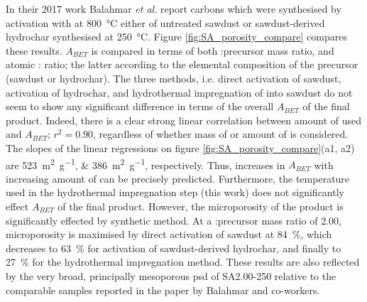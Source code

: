 In their 2017 work Balahmar \textit{et al.} report carbons which were synthesised by activation with  at \qty{800}{\degreeCelsius} either of untreated sawdust or sawdust-derived \gls{hydrochar} synthesised at \qty{250}{\degreeCelsius}.\citep{Balahmar2017Biomass} Figure \ref{fig:SA_porosity_compare} compares these results. $A_{BET}$ is compared in terms of both :precursor mass ratio, and atomic : ratio; the latter according to the elemental composition of the precursor (sawdust or \gls{hydrochar}). The three methods, i.e. direct activation of sawdust, activation of \gls{hydrochar}, and hydrothermal impregnation of  into sawdust do not seem to show any significant difference in terms of the overall $A_{BET}$ of the final product. Indeed, there is a clear strong linear correlation  between amount of  used and $A_{BET}$; $r^2=0.90$, regardless of whether mass of  or amount of  is considered. The slopes of the linear regressions on figure \ref{fig:SA_porosity_compare}(a1, a2) are \qtylist[list-units=single]{523;386}{\metre\squared\per\gram}, respectively. Thus, increases in $A_{BET}$ with increasing amount of  can be precisely predicted. Furthermore, the temperature used in the hydrothermal impregnation step (this work) does not significantly effect $A_{BET}$ of the final product. However, the microporosity of the product is significantly effected by synthetic method. At a :precursor mass ratio of 2.00, microporosity is maximised by direct activation of sawdust at \qty{84}{\percent}, which decreases to \qty{63}{\percent} for activation of sawdust-derived \gls{hydrochar}, and finally to \qty{27}{\percent} for the hydrothermal impregnation method. These results are also reflected by the very broad, principally mesoporous \gls{psd} of SA2.00-250 relative to the comparable samples reported in the paper by Balahmar and co-workers.\citep{Balahmar2017Biomass} 


